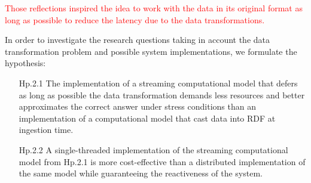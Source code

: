 \textcolor{red}{Those reflections inspired the idea to work with the data in its original format as long as possible to reduce the latency due to the data transformations.}

In order to investigate the research questions taking in account the data transformation problem and possible system implementations, we formulate the hypothesis: 
\begin{itemize}[leftmargin=42pt]
\item[\textsf{Hp.2.1}] The implementation of a streaming computational model that defers as long as possible the data transformation demands less resources and better approximates the correct answer under stress conditions than an implementation of a computational model that cast data into RDF at ingestion time.
\item[\textsf{Hp.2.2}] A single-threaded implementation of the streaming computational model from \textsf{Hp.2.1} is more cost-effective than a distributed implementation of the same model while guaranteeing the reactiveness of the system.
\end{itemize}





